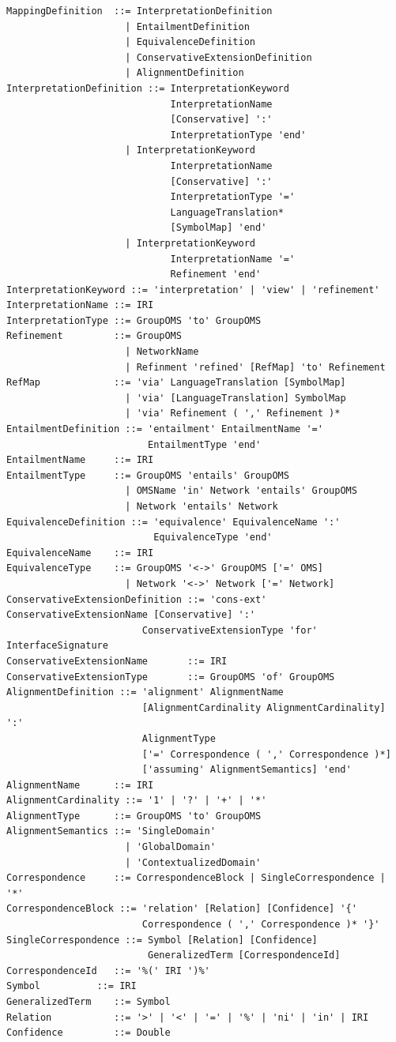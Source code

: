 \documentclass[10pt,fleqn,final]{scrreprt}
\newenvironment{definitions}[0]{\medskip }{}
\begin{document}
\begin{definitions}
\begin{lstlisting}[language=ebnf,mathescape]
MappingDefinition  ::= InterpretationDefinition
                     | EntailmentDefinition
                     | EquivalenceDefinition
                     | ConservativeExtensionDefinition
                     | AlignmentDefinition
InterpretationDefinition ::= InterpretationKeyword
                             InterpretationName
                             [Conservative] ':'
                             InterpretationType 'end'
                     | InterpretationKeyword
                             InterpretationName
                             [Conservative] ':'
                             InterpretationType '='
                             LanguageTranslation*
                             [SymbolMap] 'end'
                     | InterpretationKeyword
                             InterpretationName '='
                             Refinement 'end'
InterpretationKeyword ::= 'interpretation' | 'view' | 'refinement'
InterpretationName ::= IRI
InterpretationType ::= GroupOMS 'to' GroupOMS
Refinement         ::= GroupOMS
                     | NetworkName
                     | Refinment 'refined' [RefMap] 'to' Refinement
RefMap             ::= 'via' LanguageTranslation [SymbolMap]
                     | 'via' [LanguageTranslation] SymbolMap
                     | 'via' Refinement ( ',' Refinement )*
EntailmentDefinition ::= 'entailment' EntailmentName '='
                         EntailmentType 'end'
EntailmentName     ::= IRI
EntailmentType     ::= GroupOMS 'entails' GroupOMS
                     | OMSName 'in' Network 'entails' GroupOMS
                     | Network 'entails' Network
EquivalenceDefinition ::= 'equivalence' EquivalenceName ':'
                          EquivalenceType 'end'
EquivalenceName    ::= IRI
EquivalenceType    ::= GroupOMS '<->' GroupOMS ['=' OMS]
                     | Network '<->' Network ['=' Network]
ConservativeExtensionDefinition ::= 'cons-ext' ConservativeExtensionName [Conservative] ':'
                        ConservativeExtensionType 'for' InterfaceSignature
ConservativeExtensionName       ::= IRI
ConservativeExtensionType       ::= GroupOMS 'of' GroupOMS
AlignmentDefinition ::= 'alignment' AlignmentName
                        [AlignmentCardinality AlignmentCardinality] ':'
                        AlignmentType
                        ['=' Correspondence ( ',' Correspondence )*]
                        ['assuming' AlignmentSemantics] 'end'
AlignmentName      ::= IRI
AlignmentCardinality ::= '1' | '?' | '+' | '*'
AlignmentType      ::= GroupOMS 'to' GroupOMS
AlignmentSemantics ::= 'SingleDomain'
                     | 'GlobalDomain'
                     | 'ContextualizedDomain'
Correspondence     ::= CorrespondenceBlock | SingleCorrespondence | '*'
CorrespondenceBlock ::= 'relation' [Relation] [Confidence] '{'
                        Correspondence ( ',' Correspondence )* '}'
SingleCorrespondence ::= Symbol [Relation] [Confidence]
                         GeneralizedTerm [CorrespondenceId]
CorrespondenceId   ::= '%(' IRI ')%'
Symbol          ::= IRI
GeneralizedTerm    ::= Symbol
Relation           ::= '>' | '<' | '=' | '%' | 'ni' | 'in' | IRI
Confidence         ::= Double
\end{lstlisting}


\end{definitions}
\end{document}
